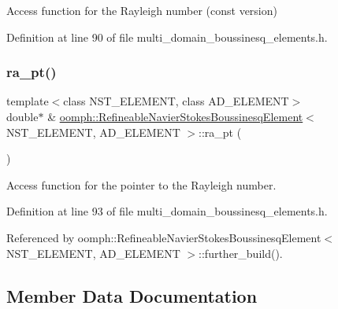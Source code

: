 Access function for the Rayleigh number (const version) 



Definition at line 90 of file multi\+\_\+domain\+\_\+boussinesq\+\_\+elements.\+h.

\mbox{\label{classoomph_1_1RefineableNavierStokesBoussinesqElement_ac2f3ff1714a6859b151da46109eda0ae}} 
\subsubsection{\texorpdfstring{ra\+\_\+pt()}{ra\_pt()}}
{\footnotesize\ttfamily template$<$class N\+S\+T\+\_\+\+E\+L\+E\+M\+E\+NT, class A\+D\+\_\+\+E\+L\+E\+M\+E\+NT$>$ \\
double$\ast$ \& \hyperlink{classoomph_1_1RefineableNavierStokesBoussinesqElement}{oomph\+::\+Refineable\+Navier\+Stokes\+Boussinesq\+Element}$<$ N\+S\+T\+\_\+\+E\+L\+E\+M\+E\+NT, A\+D\+\_\+\+E\+L\+E\+M\+E\+NT $>$\+::ra\+\_\+pt (\begin{DoxyParamCaption}{ }\end{DoxyParamCaption})\hspace{0.3cm}{\ttfamily [inline]}}



Access function for the pointer to the Rayleigh number. 



Definition at line 93 of file multi\+\_\+domain\+\_\+boussinesq\+\_\+elements.\+h.



Referenced by oomph\+::\+Refineable\+Navier\+Stokes\+Boussinesq\+Element$<$ N\+S\+T\+\_\+\+E\+L\+E\+M\+E\+N\+T, A\+D\+\_\+\+E\+L\+E\+M\+E\+N\+T $>$\+::further\+\_\+build().



\subsection{Member Data Documentation}
\mbox{\label{classoomph_1_1RefineableNavierStokesBoussinesqElement_a4ea4706d0f735b1986287038191ee4e9}} 
